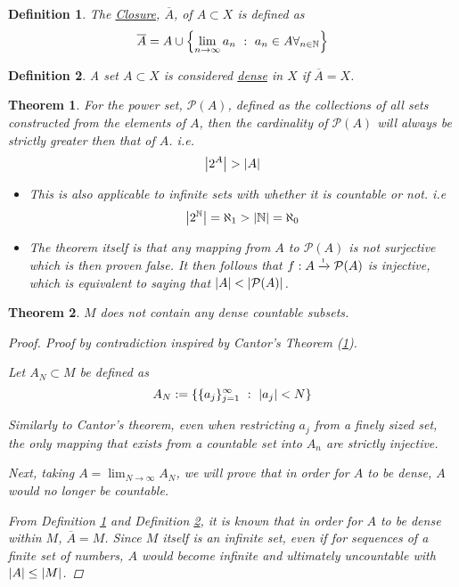 \documentclass[]{article}
\newcommand{\N}{\mathbb{N}}
\newcommand{\toI}{\xrightarrow{\textsf{\tiny I}}}
\newcommand{\st}{\ : \ }
\newtheorem{definition}{Definition}
\newtheorem{theorem}{Theorem}
\begin{document}

\begin{definition}\label{def:closure}
    The \underline{\emph{Closure}}, $\overline{A}$, of $A \subset X$ is defined as
    \[
        \overline{A} = A \cup \qty{
            \lim_{n\to\infty} a_n \st a_n \in A \forall_{n \in \N}
        }
    \]
\end{definition}

\begin{definition}\label{def:dense}
    A set $A \subset X$ is considered \underline{\emph{dense}} in $X$ if $\overline{A} = X$.
\end{definition}

\begin{theorem}\label{thm:cantor}
    For the power set, $\mathcal{P}(A)$, 
    defined as the collections of all sets constructed from the elements of $A$, 
    then the cardinality of $\mathcal{P}(A)$ will always be strictly greater then that of $A$.
    i.e.\[
        \abs{2^{A}} > \abs{A}
    \]
    \begin{itemize}
        \item This is also applicable to infinite sets with whether it is countable or not.
        i.e\[
            \abs{2^\N} = \aleph_1 > \abs{\N} = \aleph_0
        \]
        \item The theorem itself is that any mapping from $A$ to $\mathcal{P}(A)$ is not surjective which is then proven false.
        It then follows that $f : A \toI \mathcal{P}(A)$ is injective, 
        which is equivalent to saying that $\abs{A} < \abs{\mathcal{P}(A)}$.
    \end{itemize}
\end{theorem}

\begin{theorem}
    $M$ does not contain any dense countable subsets.
    \begin{proof}
        Proof by contradiction inspired by Cantor's Theorem (\ref{thm:cantor}).

        Let $A_N \subset M$ be defined as 
        \[
            A_N := \{\{a_j\}_{j=1}^{\infty} \st \abs{a_j} < N\}
        \]

        Similarly to Cantor's theorem, even when restricting $a_j$ from a finely sized set,
        the only mapping that exists from a countable set into $A_n$ are strictly injective. 
        
        Next, taking $A = \lim_{N \to \infty} A_N$, 
        we will prove that in order for $A$ to be dense, $A$ would no longer be countable.

        From Definition \ref{def:closure} and Definition \ref{def:dense}, 
        it is known that in order for $A$ to be dense within $M$, 
        $\overline{A} = M$. 
        Since $M$ itself is an infinite set, 
        even if for sequences of a finite set of numbers,
        $A$ would become infinite and ultimately uncountable with $\abs{A} \leq \abs{M}$.
    \end{proof}
\end{theorem}
\end{document}
